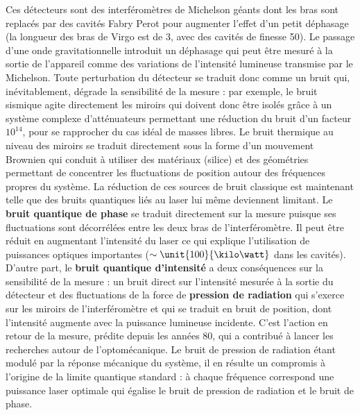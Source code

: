 \documentclass[12pt,a4paper]{article}
\begin{document}
Ces détecteurs sont des interféromètres de Michelson géants dont les bras sont replacés par des cavités Fabry Perot pour augmenter l'effet d'un petit déphasage (la longueur des bras de Virgo est de \unit{3}{\kilo\meter}, avec des cavités de finesse 50).
Le passage d'une onde gravitationnelle introduit un déphasage qui peut être mesuré à la sortie de l'appareil comme des variations de l'intensité lumineuse transmise par le Michelson.
Toute perturbation du détecteur se traduit donc comme un bruit qui, inévitablement, dégrade la sensibilité de la mesure : par exemple, le bruit sismique agite directement les miroirs qui doivent donc être isolés grâce à un système complexe d'atténuateurs permettant une réduction du bruit d'un facteur $10^{14}$, pour se rapprocher du cas idéal de masses libres.
Le bruit thermique au niveau des miroirs se traduit directement sous la forme d'un mouvement Brownien qui conduit à utiliser des matériaux (silice) et des géométries permettant de concentrer les fluctuations de position autour des fréquences propres du système.
La réduction de ces sources de bruit classique est maintenant telle que des bruits quantiques liés au laser lui même deviennent limitant.
Le \textbf{bruit quantique de phase} se traduit directement sur la mesure puisque ses fluctuations sont décorrélées entre les deux bras de l'interféromètre.
Il peut être réduit en augmentant l'intensité du laser ce qui explique l'utilisation de puissances optiques importantes ($\sim \unit{100}{\kilo\watt}$ dans les cavités).
D'autre part, le \textbf{bruit quantique d'intensité} a deux conséquences sur la sensibilité de la mesure : un bruit direct sur l'intensité mesurée à la sortie du détecteur et des fluctuations de la force de \textbf{pression de radiation} qui s'exerce sur les miroirs de l'interféromètre et qui se traduit en bruit de position, dont l'intensité augmente avec la puissance lumineuse incidente.
C'est l'action en retour de la mesure, prédite depuis les années 80, qui a contribué à lancer les recherches autour de l'optomécanique.
Le bruit de pression de radiation étant modulé par la réponse mécanique du système, il en résulte un compromis à l'origine de la limite quantique standard : à chaque fréquence correspond une puissance laser optimale qui égalise le bruit de pression de radiation et le bruit de phase.
\end{document}
